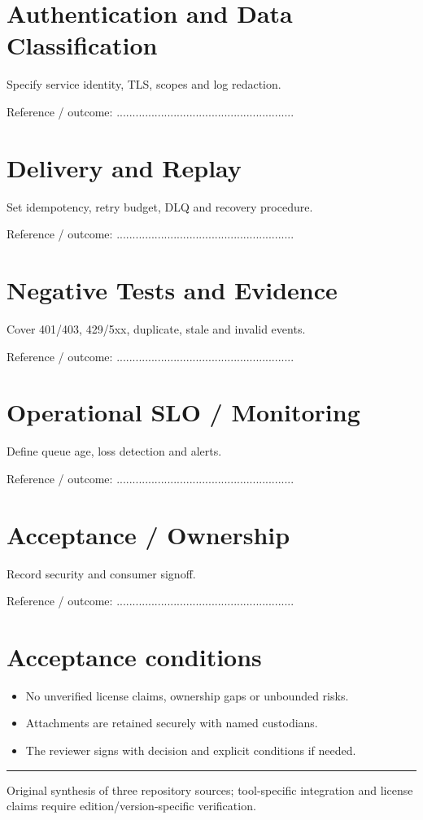 \documentclass[10pt,letterpaper]{article}
\begin{document}
\section{Authentication and Data Classification}
Specify service identity, TLS, scopes and log redaction.\par
Reference / outcome: ........................................................\par
\section{Delivery and Replay}
Set idempotency, retry budget, DLQ and recovery procedure.\par
Reference / outcome: ........................................................\par
\section{Negative Tests and Evidence}
Cover 401/403, 429/5xx, duplicate, stale and invalid events.\par
Reference / outcome: ........................................................\par
\section{Operational SLO / Monitoring}
Define queue age, loss detection and alerts.\par
Reference / outcome: ........................................................\par
\section{Acceptance / Ownership}
Record security and consumer signoff.\par
Reference / outcome: ........................................................\par
\section{Acceptance conditions}
\begin{itemize}
\item No unverified license claims, ownership gaps or unbounded risks.
\item Attachments are retained securely with named custodians.
\item The reviewer signs with decision and explicit conditions if needed.
\end{itemize}
\vfill\noindent\color{muted}\rule{\linewidth}{0.4pt}\par\scriptsize Original synthesis of three repository sources; tool-specific integration and license claims require edition/version-specific verification.\normalsize
\end{document}
